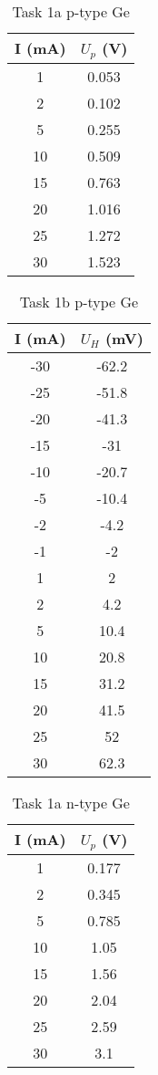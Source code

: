 \documentclass[11pt]{article}
\begin{document}
	\begin{table}[htbp]
		\centering
		\caption{Task 1a p-type Ge}
		\begin{tabular}{cc}
			\toprule
			I (mA) & $U_p$ (V) \\
			\midrule
			1 & 0.053 \\
			2 & 0.102 \\
			5 & 0.255 \\
			10 & 0.509 \\
			15 & 0.763 \\
			20 & 1.016 \\
			25 & 1.272 \\
			30 & 1.523 \\
			\bottomrule
		\end{tabular}%
		\label{tab:1}%
	\end{table}%
	
	\begin{table}[htbp]
		\centering
		\caption{Task 1b p-type Ge}
		\begin{tabular}{cc}
			\toprule
			I (mA) & $U_H$ (mV) \\
			\midrule
			-30 & -62.2 \\
			-25 & -51.8 \\
			-20 & -41.3 \\
			-15 & -31 \\
			-10 & -20.7 \\
			-5 & -10.4 \\
			-2 & -4.2 \\
			-1 & -2 \\
			1 & 2 \\
			2 & 4.2 \\
			5 & 10.4 \\
			10 & 20.8 \\
			15 & 31.2 \\
			20 & 41.5 \\
			25 & 52 \\
			30 & 62.3 \\
			\bottomrule
		\end{tabular}%
		\label{tab:2}%
	\end{table}%
	
	\begin{table}[htbp]
		\centering
		\caption{Task 1a n-type Ge}
		\begin{tabular}{cc}
			\toprule
			I (mA) & $U_p$ (V) \\
			\midrule
			1 & 0.177 \\
			2 & 0.345 \\
			5 & 0.785 \\
			10 & 1.05 \\
			15 & 1.56 \\
			20 & 2.04 \\
			25 & 2.59 \\
			30 & 3.1 \\
			\bottomrule
		\end{tabular}%
		\label{tab:3}%
	\end{table}%
	
\end{document}
